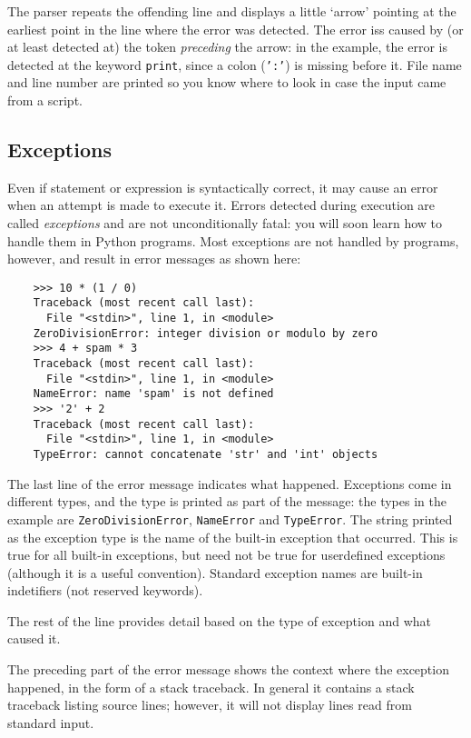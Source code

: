 \documentclass[UTF8]{article}
\begin{document}
The parser repeats the offending line and displays a little `arrow' pointing at the earliest point
in the line where the error was detected. The error iss caused by (or at least detected at) the
token \emph{preceding} the arrow: in the example, the error is detected at the keyword
\texttt{print}, since a colon (\texttt{':'}) is missing before it. File name and line
number are printed so you know where to look in case the input came from a script.

\subsection{Exceptions}
Even if statement or expression is syntactically correct, it may cause an error when an attempt is
made to execute it. Errors detected during execution are called \emph{exceptions} and are not
unconditionally fatal: you will soon learn how to handle them in Python programs. Most exceptions
are not handled by programs, however, and result in error messages as shown here:
\begin{verbatim}
    >>> 10 * (1 / 0)
    Traceback (most recent call last):
      File "<stdin>", line 1, in <module>
    ZeroDivisionError: integer division or modulo by zero
    >>> 4 + spam * 3
    Traceback (most recent call last):
      File "<stdin>", line 1, in <module>
    NameError: name 'spam' is not defined
    >>> '2' + 2
    Traceback (most recent call last):
      File "<stdin>", line 1, in <module>
    TypeError: cannot concatenate 'str' and 'int' objects
\end{verbatim}

The last line of the error message indicates what happened. Exceptions come in different types, and
the type is printed as part of the message: the types in the example are \texttt{ZeroDivisionError},
\texttt{NameError} and \texttt{TypeError}. The string printed as the exception type is the name of
the built-in exception that occurred. This is true for all built-in exceptions, but need not be
true for userdefined exceptions (although it is a useful convention). Standard exception names are
built-in indetifiers (not reserved keywords).

The rest of the line provides detail based on the type of exception and what caused it.

The preceding part of the error message shows the context where the exception happened, in the form
of a stack traceback. In general it contains a stack traceback listing source lines; however, it
will not display lines read from standard input.
\end{document}
